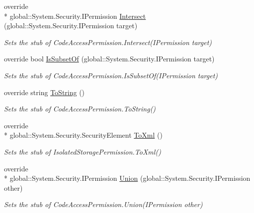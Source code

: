 \begin{DoxyCompactItemize}
override \\*
global\-::\-System.\-Security.\-I\-Permission \hyperlink{class_system_1_1_security_1_1_permissions_1_1_fakes_1_1_stub_isolated_storage_permission_a4ea6e4df579ef6d1577b1c185f05ec44}{Intersect} (global\-::\-System.\-Security.\-I\-Permission target)
\begin{DoxyCompactList}\small\item\em Sets the stub of Code\-Access\-Permission.\-Intersect(\-I\-Permission target)\end{DoxyCompactList}\item 
override bool \hyperlink{class_system_1_1_security_1_1_permissions_1_1_fakes_1_1_stub_isolated_storage_permission_a6ff5e7c08509e33162b1ad6f8a9d24b3}{Is\-Subset\-Of} (global\-::\-System.\-Security.\-I\-Permission target)
\begin{DoxyCompactList}\small\item\em Sets the stub of Code\-Access\-Permission.\-Is\-Subset\-Of(\-I\-Permission target)\end{DoxyCompactList}\item 
override string \hyperlink{class_system_1_1_security_1_1_permissions_1_1_fakes_1_1_stub_isolated_storage_permission_a5a0e28a33d4f048d6b0ea0f083748739}{To\-String} ()
\begin{DoxyCompactList}\small\item\em Sets the stub of Code\-Access\-Permission.\-To\-String()\end{DoxyCompactList}\item 
override \\*
global\-::\-System.\-Security.\-Security\-Element \hyperlink{class_system_1_1_security_1_1_permissions_1_1_fakes_1_1_stub_isolated_storage_permission_a42bc3e5a71c1ab462ef748df8803b3d9}{To\-Xml} ()
\begin{DoxyCompactList}\small\item\em Sets the stub of Isolated\-Storage\-Permission.\-To\-Xml()\end{DoxyCompactList}\item 
override \\*
global\-::\-System.\-Security.\-I\-Permission \hyperlink{class_system_1_1_security_1_1_permissions_1_1_fakes_1_1_stub_isolated_storage_permission_a9bec3a139ddf2a5a93e1939d6d952467}{Union} (global\-::\-System.\-Security.\-I\-Permission other)
\begin{DoxyCompactList}\small\item\em Sets the stub of Code\-Access\-Permission.\-Union(\-I\-Permission other)\end{DoxyCompactList}\end{DoxyCompactItemize}
